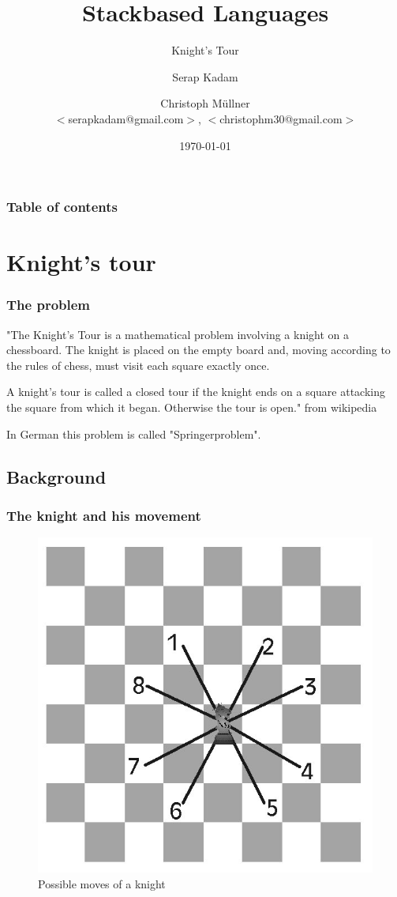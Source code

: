 \documentclass{beamer}
\begin{document}
\title{Stackbased Languages}
\author[Serap Kadam \and Christoph M{\"u}llner]{Serap Kadam \and Christoph M{\"u}llner \\
$<$serapkadam@gmail.com$>$, $<$christophm30@gmail.com$>$}
\subtitle{Knight's Tour}

\date{\today} 

\begin{frame}
\titlepage
\end{frame}

\begin{frame}
\frametitle{Table of contents}
\tableofcontents
\end{frame} 

\section{Knight's tour} 
\begin{frame}
\frametitle{The problem}
"The Knight's Tour is a mathematical problem involving a knight
on a chessboard. The knight is placed on the empty board and,
moving according to the rules of chess, must visit each square
exactly once. 

A knight's tour is called a closed tour if the
knight ends on a square attacking the square from which it began.
Otherwise the tour is open." from wikipedia 

In German this problem is called "Springerproblem".

\end{frame}

\subsection{Background}
\begin{frame}
\frametitle{The knight and his movement}
\begin{figure}
\includegraphics[scale=0.25]{sprung}
\caption{Possible moves of a knight}
\end{figure}
\end{frame}
\end{document}
